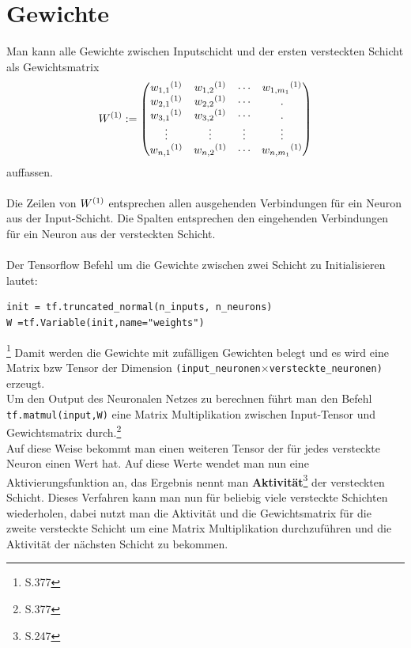 \section{Gewichte}
Man kann alle Gewichte zwischen Inputschicht und der ersten versteckten Schicht als Gewichtsmatrix \begin{equation}
W\textsuperscript{(1)}:=
\begin{pmatrix}
w_{1,1}\textsuperscript{(1)} & w_{1,2}\textsuperscript{(1)} & \cdots & w_{1,m_1}\textsuperscript{(1)} \\
w_{2,1}\textsuperscript{(1)} & w_{2,2}\textsuperscript{(1)}& \cdots & .\\
w_{3,1}\textsuperscript{(1)} & w_{3,2}\textsuperscript{(1)}& \cdots & .\\
\vdots & \vdots & \vdots & \vdots \\
w_{n,1}\textsuperscript{(1)} & w_{n,2}\textsuperscript{(1)} & \cdots & w_{n,m_1}\textsuperscript{(1)}\\
\end{pmatrix} \end{equation}
auffassen.\\\\
Die Zeilen von $W\textsuperscript{(1)}$ entsprechen allen ausgehenden Verbindungen für ein Neuron aus der Input-Schicht. Die Spalten entsprechen den eingehenden Verbindungen für ein Neuron aus der versteckten Schicht. \\\\
Der Tensorflow Befehl um die Gewichte zwischen zwei Schicht zu Initialisieren lautet:\\
\begin{lstlisting}
init = tf.truncated_normal(n_inputs, n_neurons)
W =tf.Variable(init,name="weights")
\end{lstlisting}\footnote{\cite{handson} S.377}
Damit werden die Gewichte mit zufälligen Gewichten belegt und es wird eine Matrix bzw Tensor der Dimension \lstinline$(input_neuronen$$ \times $\lstinline$versteckte_neuronen)$ erzeugt.\\
Um den Output des Neuronalen Netzes zu berechnen führt man den Befehl \lstinline$tf.matmul(input,W)$ eine Matrix Multiplikation zwischen Input-Tensor und Gewichtsmatrix durch.\footnote{\cite{handson} S.377}\\
Auf diese Weise bekommt man einen weiteren Tensor der für jedes versteckte Neuron einen Wert hat. Auf diese Werte wendet man nun eine Aktivierungsfunktion an, das Ergebnis nennt man \textbf{Aktivität}\footnote{\cite{Ertel2013} S.247} der versteckten Schicht. Dieses Verfahren kann man nun für beliebig viele versteckte Schichten wiederholen, dabei nutzt man die Aktivität und die Gewichtsmatrix für die zweite versteckte Schicht um eine Matrix Multiplikation durchzuführen und die Aktivität der nächsten Schicht zu bekommen.
